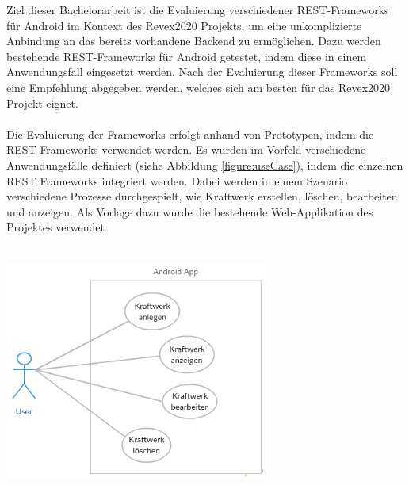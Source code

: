Ziel dieser Bachelorarbeit ist die Evaluierung verschiedener REST-Frameworks für Android im Kontext des Revex2020 Projekts, um eine unkomplizierte Anbindung an das bereits vorhandene Backend zu ermöglichen. Dazu werden bestehende REST-Frameworks für Android getestet, indem diese in einem Anwendungsfall eingesetzt werden. Nach der Evaluierung dieser Frameworks soll eine Empfehlung abgegeben werden, welches sich am besten für das Revex2020 Projekt eignet.
\\\\
Die Evaluierung der Frameworks erfolgt anhand von Prototypen, indem die REST-Frameworks verwendet werden. Es wurden im Vorfeld verschiedene Anwendungsfälle definiert (siehe Abbildung \ref{figure:useCase}), indem die einzelnen REST Frameworks integriert werden. Dabei werden in einem Szenario verschiedene Prozesse durchgespielt, wie Kraftwerk erstellen, löschen, bearbeiten und anzeigen. Als Vorlage dazu wurde die bestehende Web-Applikation des Projektes verwendet.
\\\\

\begin{minipage}{\textwidth} 
	\centering	
	\includegraphics[width=0.65\textwidth]{figures/kraftwerke_use_case.png}
	\label{figure:useCase}
	\vspace{2ex}
\end{minipage}

